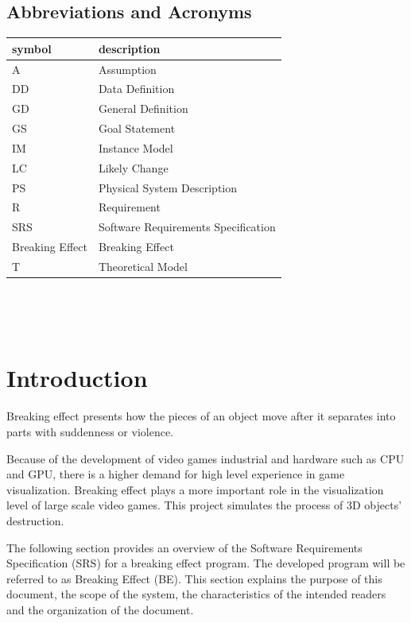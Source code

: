 \documentclass[12pt]{article}
\newcommand{\progname}{Breaking Effect} %
\begin{document}
	\subsection{Abbreviations and Acronyms}
	
	\renewcommand{\arraystretch}{1.2}
	\begin{tabular}{l l} 
		\toprule		
		\textbf{symbol} & \textbf{description}\\
		\midrule 
		A & Assumption\\
		DD & Data Definition\\
		GD & General Definition\\
		GS & Goal Statement\\
		IM & Instance Model\\
		LC & Likely Change\\
		PS & Physical System Description\\
		R & Requirement\\
		SRS & Software Requirements Specification\\
		\progname{} & Breaking Effect\\
		T & Theoretical Model\\
		\bottomrule
	\end{tabular}\\
	
	\newpage
	
	\tableofcontents
	
	~\newpage
	
	
	\section{Introduction}
	
	Breaking effect presents how the pieces of an object move after it separates into parts with suddenness or violence. 
	
	Because of the development of video games industrial and hardware such as CPU
	and GPU, there is a higher demand for high level experience in game
	visualization. Breaking effect plays a more important role in the visualization
	level of large scale video games.   This project simulates the process of 3D objects’ destruction.
	
	The following section provides an overview of the Software Requirements Specification (SRS) for a breaking effect program. The developed program will be referred to as Breaking Effect (BE). This section explains the purpose of this document, the scope of the system, the characteristics of the intended readers and the organization of the document.
	
\end{document}

